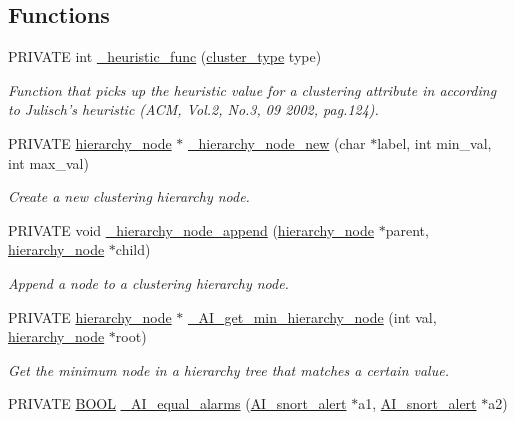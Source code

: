 \subsection*{Functions}
\begin{DoxyCompactItemize}
\item 
PRIVATE int \hyperlink{group__cluster_ga81f5fa721719fdb281595a568eef2101}{\_\-heuristic\_\-func} (\hyperlink{spp__ai_8h_ae2ff3c6586aa2ab211a102abfde86640}{cluster\_\-type} type)
\begin{DoxyCompactList}\small\item\em Function that picks up the heuristic value for a clustering attribute in according to Julisch's heuristic (ACM, Vol.2, No.3, 09 2002, pag.124). \item\end{DoxyCompactList}\item 
PRIVATE \hyperlink{struct__hierarchy__node}{hierarchy\_\-node} $\ast$ \hyperlink{group__cluster_ga2f1a22cfea64e4669da0467620c3e3b3}{\_\-hierarchy\_\-node\_\-new} (char $\ast$label, int min\_\-val, int max\_\-val)
\begin{DoxyCompactList}\small\item\em Create a new clustering hierarchy node. \item\end{DoxyCompactList}\item 
PRIVATE void \hyperlink{group__cluster_ga5601a1f603d9c870ef6e2df192e30c30}{\_\-hierarchy\_\-node\_\-append} (\hyperlink{struct__hierarchy__node}{hierarchy\_\-node} $\ast$parent, \hyperlink{struct__hierarchy__node}{hierarchy\_\-node} $\ast$child)
\begin{DoxyCompactList}\small\item\em Append a node to a clustering hierarchy node. \item\end{DoxyCompactList}\item 
PRIVATE \hyperlink{struct__hierarchy__node}{hierarchy\_\-node} $\ast$ \hyperlink{group__cluster_ga6ddddcd505b1f763c339e81fc143e079}{\_\-AI\_\-get\_\-min\_\-hierarchy\_\-node} (int val, \hyperlink{struct__hierarchy__node}{hierarchy\_\-node} $\ast$root)
\begin{DoxyCompactList}\small\item\em Get the minimum node in a hierarchy tree that matches a certain value. \item\end{DoxyCompactList}\item 
PRIVATE \hyperlink{spp__ai_8h_a3e5b8192e7d9ffaf3542f1210aec18dd}{BOOL} \hyperlink{group__cluster_ga0f91c8bfc37a3975f5c26b19fd6c5cba}{\_\-AI\_\-equal\_\-alarms} (\hyperlink{struct__AI__snort__alert}{AI\_\-snort\_\-alert} $\ast$a1, \hyperlink{struct__AI__snort__alert}{AI\_\-snort\_\-alert} $\ast$a2)

\end{DoxyCompactItemize}
